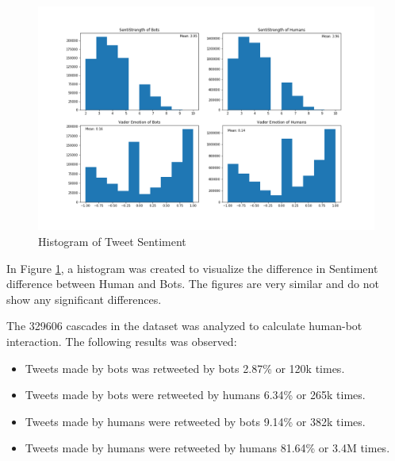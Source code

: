 \documentclass[letterpaper]{article}
\begin{document}
\begin{figure}[H]
    \includegraphics[width=\linewidth]{images/emotions.png}
    \caption{Histogram of Tweet Sentiment}
    \label{fig:setiment_histogram}
\end{figure}

In Figure \ref{fig:setiment_histogram}, a histogram was created to visualize the difference in Sentiment difference between Human and Bots. 
The figures are very similar and do not show any significant differences.\par


The 329606 cascades in the dataset was analyzed to calculate human-bot interaction. The following results was observed: 

\begin{itemize}
    \item Tweets made by bots was retweeted by bots 2.87\% or 120k times.
    \item Tweets made by bots were retweeted by humans 6.34\% or 265k times. 
    \item Tweets made by humans were retweeted by bots 9.14\% or 382k times. 
    \item Tweets made by humans were retweeted by humans 81.64\% or 3.4M times. 
\end{itemize}
\end{document}
